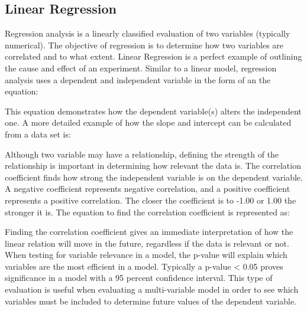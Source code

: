 \documentclass{article}
\begin{document}
\begin{doublespacing}
\section{Linear Regression}

Regression analysis is a linearly classified evaluation of two variables (typically numerical). The objective of regression is to determine how two variables are correlated and to what extent. Linear Regression is a perfect example of outlining the cause and effect of an experiment. Similar to a linear model, regression analysis uses a dependent and independent variable in the form of an the equation:

\begin{center}\end{center}

This equation demonstrates how the dependent variable(s) alters the independent one. A more detailed example of how the slope and intercept can be calculated from a data set is:

\begin{center} \end{center}

\begin{center}   \end{center}

Although two variable may have a relationship, defining the strength of the relationship is important in determining how relevant the data is. The correlation coefficient finds how strong the independent variable is on the dependent variable. A negative coefficient represents negative correlation, and a positive coefficient represents a positive correlation. The closer the coefficient is to -1.00 or 1.00 the stronger it is. The equation to find the correlation coefficient is represented as:

\begin {center}  \end {center}

Finding the correlation coefficient gives an immediate interpretation of how the linear relation will move in the future, regardless if the data is relevant or not. When testing for variable relevance in a model, the p-value will explain which variables are the most efficient in a model. Typically a p-value < 0.05 proves significance in a model with a 95 percent confidence interval. This type of evaluation is useful when evaluating a multi-variable model in order to see which variables must be included to determine future values of the dependent variable.


\end{doublespacing}
\end{document}
